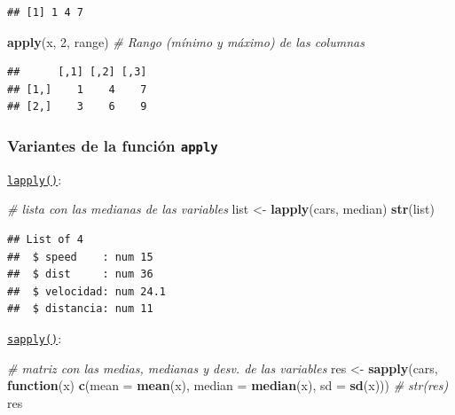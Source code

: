 \documentclass[]{book}
\newenvironment{Shaded}{\begin{snugshade}}{\end{snugshade}}
\newcommand{\KeywordTok}[1]{\textcolor[rgb]{0.13,0.29,0.53}{\textbf{#1}}}
\newcommand{\DataTypeTok}[1]{\textcolor[rgb]{0.13,0.29,0.53}{#1}}
\newcommand{\DecValTok}[1]{\textcolor[rgb]{0.00,0.00,0.81}{#1}}
\newcommand{\StringTok}[1]{\textcolor[rgb]{0.31,0.60,0.02}{#1}}
\newcommand{\CommentTok}[1]{\textcolor[rgb]{0.56,0.35,0.01}{\textit{#1}}}
\newcommand{\ControlFlowTok}[1]{\textcolor[rgb]{0.13,0.29,0.53}{\textbf{#1}}}
\newcommand{\NormalTok}[1]{#1}
\begin{document}
\begin{verbatim}
## [1] 1 4 7
\end{verbatim}

\begin{Shaded}
\begin{Highlighting}[]
\KeywordTok{apply}\NormalTok{(x, }\DecValTok{2}\NormalTok{, range)  }\CommentTok{# Rango (mínimo y máximo) de las columnas}
\end{Highlighting}
\end{Shaded}

\begin{verbatim}
##      [,1] [,2] [,3]
## [1,]    1    4    7
## [2,]    3    6    9
\end{verbatim}

\subsubsection{\texorpdfstring{Variantes de la función
\texttt{apply}}{Variantes de la función apply}}\label{variantes-de-la-funciuxf3n-apply}

\href{https://www.rdocumentation.org/packages/base/versions/3.6.1/topics/lapply}{\texttt{lapply()}}:

\begin{Shaded}
\begin{Highlighting}[]
\CommentTok{# lista con las medianas de las variables}
\NormalTok{list <-}\StringTok{ }\KeywordTok{lapply}\NormalTok{(cars, median)}
\KeywordTok{str}\NormalTok{(list)}
\end{Highlighting}
\end{Shaded}

\begin{verbatim}
## List of 4
##  $ speed    : num 15
##  $ dist     : num 36
##  $ velocidad: num 24.1
##  $ distancia: num 11
\end{verbatim}

\href{https://www.rdocumentation.org/packages/base/versions/3.6.1/topics/sapply}{\texttt{sapply()}}:

\begin{Shaded}
\begin{Highlighting}[]
\CommentTok{# matriz con las medias, medianas y desv. de las variables}
\NormalTok{res <-}\StringTok{ }\KeywordTok{sapply}\NormalTok{(cars, }
          \ControlFlowTok{function}\NormalTok{(x) }\KeywordTok{c}\NormalTok{(}\DataTypeTok{mean =} \KeywordTok{mean}\NormalTok{(x), }\DataTypeTok{median =} \KeywordTok{median}\NormalTok{(x), }\DataTypeTok{sd =} \KeywordTok{sd}\NormalTok{(x)))}
\CommentTok{# str(res)}
\NormalTok{res}
\end{Highlighting}
\end{Shaded}
\end{document}
